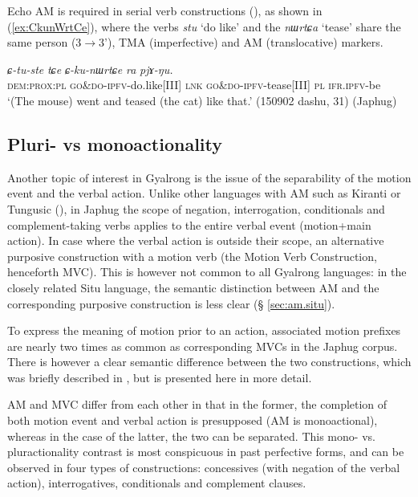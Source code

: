 \documentclass[oneside,a4paper,11pt]{article}
\newcommand{\ipa}[1]{{\phon\textit{#1}}}
\newcommand{\japhug}[2]{\textit{\phon#1} `#2'}
\newcommand{\rouge}[1]{{\color{red}#1}}
\begin{document}
Echo AM is required in serial verb constructions (\citealt[253-255]{jacques16complementation}), as shown in (\ref{ex:CkunWrtCe}), where the verbs \japhug{stu}{do like} and the \japhug{nɯrtɕa}{tease} share the same person (3$\rightarrow$3'), TMA (imperfective) and AM (translocative) markers.

\begin{exe}
\ex \label{ex:CkunWrtCe}
\gll \ipa{kɯra}	\ipa{\rouge{ɕ}-tu-ste}	\ipa{tɕe}	\ipa{\rouge{ɕ}-ku-nɯrtɕe}	\ipa{ra}	\ipa{pjɤ-ŋu.} \\
\textsc{dem}:\textsc{prox}:\textsc{pl} \rouge{\textsc{go\&do}}-\textsc{ipfv}-do.like[III] \textsc{lnk}  \rouge{\textsc{go\&do}}-\textsc{ipfv}-tease[III] \textsc{pl} \textsc{ifr}.\textsc{ipfv}-be \\
\glt `(The mouse) went and teased (the cat) like that.' (150902 dashu, 31) (Japhug)
\end{exe}


 \subsection{Pluri- vs monoactionality} \label{sec:am.japhug}
Another topic of interest in Gyalrong is the issue of the separability of the motion event and the verbal action. Unlike other languages with AM such as Kiranti or Tungusic (\citealt{stojnova16nda, fuente18am}), in Japhug the scope of negation, interrogation, conditionals and complement-taking verbs applies to the entire verbal event (motion+main action). In case where the verbal action is outside their scope, an alternative purposive construction with a motion verb (the Motion Verb Construction, henceforth MVC). This is however not common to all Gyalrong languages: in the closely related Situ language, the semantic distinction between AM and the corresponding purposive construction is less clear (§ \ref{sec:am.situ}). 
 
To express the meaning of motion prior to an action, associated motion prefixes are nearly two times as common as corresponding MVCs in the Japhug corpus. There is however a clear semantic difference between the two constructions, which was briefly described in \citet{jacques13harmonization}, but is presented here in more detail.

AM and MVC differ from each other in that in the former, the completion of both motion event and verbal action is presupposed (AM is monoactional), whereas in the case of the latter, the two can be separated. This mono- vs. pluractionality contrast is most conspicuous in past perfective forms, and can be observed in four types of constructions: concessives (with negation of the verbal action), interrogatives, conditionals and complement clauses.
\end{document}
